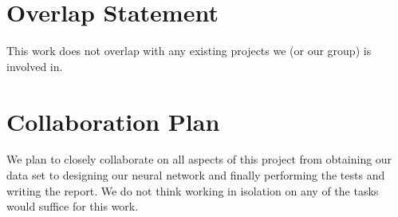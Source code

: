\documentclass{article} %
\begin{document}
\section{Overlap Statement}

This work does not overlap with any existing projects we (or our group) is involved in.

\section{Collaboration Plan}

We plan to closely collaborate on all aspects of this project from obtaining our data set 
to designing our neural network and finally performing the tests and writing the report. We do not
think working in isolation on any of the tasks would suffice for this work.
%
%
%
%
%
%
%
\printbibliography
\end{document}

